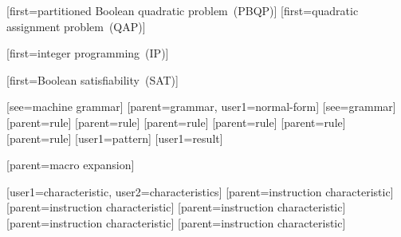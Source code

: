 %
        [first={partitioned Boolean quadratic problem~(PBQP)}]
%
        [first={quadratic assignment problem~(QAP)}]

%
        [first={integer programming~(IP)}]

%
        [first={Boolean satisfiability~(SAT)}]



[see={machine grammar}]
[parent={grammar}, user1={normal-form}]
[see={grammar}]
[parent={rule}]
[parent={rule}]
[parent={rule}]
[parent={rule}]
[parent={rule}]
[parent={rule}]
[user1={pattern}]
[user1={result}]



[parent={macro expansion}]

%
        [user1={characteristic}, user2={characteristics}]
%
        [parent={instruction characteristic}]
%
        [parent={instruction characteristic}]
%
        [parent={instruction characteristic}]
%
        [parent={instruction characteristic}]
%
        [parent={instruction characteristic}]

